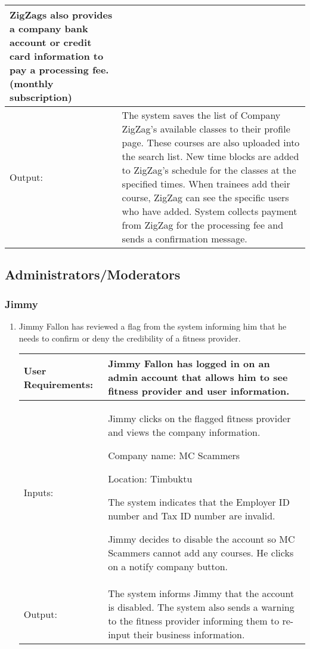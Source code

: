 \documentclass[12pt]{article}
\begin{document}
\begin{enumerate}
\begin{tabular}{| m{4cm} | m{11cm} |}
ZigZags also provides a company bank account or credit card information to pay a processing fee. (monthly subscription)
\\
\hline
Output: & The system saves the list of Company ZigZag’s available classes to their profile page. These courses are also uploaded into the search list.  New time blocks are added to ZigZag’s schedule for the classes at the specified times.  When trainees add their course, ZigZag can see the specific users who have added.  System collects payment from ZigZag for the processing fee and sends a confirmation message. \\
\hline
\end{tabular}
\end{enumerate}

\newpage
\subsection{Administrators/Moderators}
\subsubsection{Jimmy}
\begin{enumerate}
\item Jimmy Fallon has reviewed a flag from the system informing him that he needs to confirm or deny the credibility of a fitness provider.

\begin{tabular}{| m{4cm} | m{11cm} |}
\hline
User Requirements: & Jimmy Fallon has logged in on an admin account that allows him to see fitness provider and user information.\\
\hline
Inputs: & Jimmy clicks on the flagged fitness provider and views the company information. 

Company name: MC Scammers

Location: Timbuktu

The system indicates that the Employer ID number and Tax ID number are invalid. 
\newline

Jimmy decides to disable the account so MC Scammers cannot add any courses. He clicks on a notify company button.
\\
\hline
Output: & The system informs Jimmy that the account is disabled.  The system also sends a warning to the fitness provider informing them to re-input their business information. 
\\
\hline
\end{tabular}
\end{enumerate}
\end{document}

